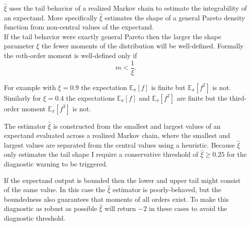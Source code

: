 \documentclass[
  letterpaper,
  DIV=11,
  numbers=noendperiod]{scrartcl}
\begin{document}
\(\hat{\xi}\) uses the tail behavior of a realized Markov chain to
estimate the integrability of an expectand. More specifically
\(\hat{\xi}\) estimates the shape of a general Pareto density function
from non-central values of the expectand.\\
If the tail behavior were exactly general Pareto then the larger the
shape parameter \(\xi\) the fewer moments of the distribution will be
well-defined. Formally the \(m\)th-order moment is well-defined only if
\[
m < \frac{1}{\xi}.
\]

For example with \(\xi = 0.9\) the expectation \(\mathbb{E}_{\pi}[f]\)
is finite but \(\mathbb{E}_{\pi}[f^{2}]\) is not. Similarly for
\(\xi = 0.4\) the expectations \(\mathbb{E}_{\pi}[f]\) and
\(\mathbb{E}_{\pi}[f^{2}]\) are finite but the third-order moment
\(\mathbb{E}_{\pi}[f^{3}]\) is not.

The estimator \(\hat{\xi}\) is constructed from the smallest and largest
values of an expectand evaluated across a realized Markov chain, where
the smallest and largest values are separated from the central values
using a heuristic. Because \(\hat{\xi}\) only estimates the tail shape I
require a conservative threshold of \(\hat{\xi} \ge 0.25\) for the
diagnostic warning to be triggered.

If the expectand output is bounded then the lower and upper tail might
consist of the same value. In this case the \(\hat{\xi}\) estimator is
poorly-behaved, but the boundedness also guarantees that moments of all
orders exist. To make this diagnostic as robust as possible
\(\hat{\xi}\) will return \(-2\) in these cases to avoid the diagnostic
threshold.
\end{document}
